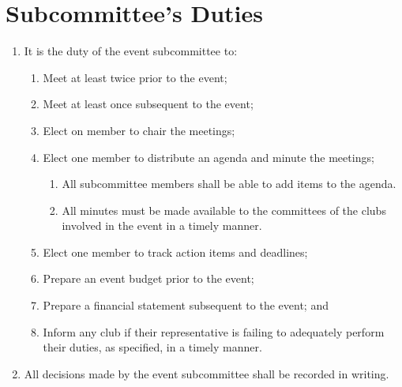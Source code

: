 \documentclass[a4paper]{article}
\newenvironment{enumsection}[1]{\section{#1} \begin{enumerate}[ref=\thesection.\theenumi]}{\end{enumerate}}
\begin{document}
\begin{enumsection}{Subcommittee's Duties}
    \item It is the duty of the event subcommittee to:
    \begin{enumerate}
        \item Meet at least twice prior to the event;
        \item Meet at least once subsequent to the event;
        \item Elect on member to chair the meetings;
        \item Elect one member to distribute an agenda and minute the meetings;
        \begin{enumerate}
            \item All subcommittee members shall be able to add items to the agenda.
            \item All minutes must be made available to the committees of the clubs involved in the event in a timely manner.
        \end{enumerate}
        \item Elect one member to track action items and deadlines;
        \item Prepare an event budget prior to the event;
        \item Prepare a financial statement subsequent to the event; and
        \item Inform any club if their representative is failing to adequately perform their duties, as specified, in a timely manner.
    \end{enumerate}
    \item All decisions made by the event subcommittee shall be recorded in writing.
\end{enumsection}
\end{document}
